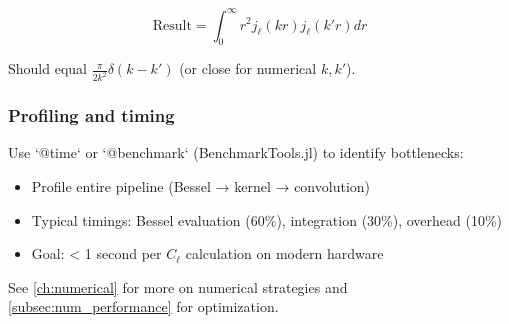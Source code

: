\begin{equation}
\text{Result} = \int_0^\infty r^2 j_\ell(kr) j_\ell(k'r) dr
\end{equation}

Should equal $\frac{\pi}{2k^2} \delta(k-k')$ (or close for numerical $k, k'$).

\subsubsection{Profiling and timing}

Use `@time` or `@benchmark` (BenchmarkTools.jl) to identify bottlenecks:

\begin{itemize}
    \item Profile entire pipeline (Bessel → kernel → convolution)
    \item Typical timings: Bessel evaluation (60\%), integration (30\%), overhead (10\%)
    \item Goal: < 1 second per $C_\ell$ calculation on modern hardware
\end{itemize}


See \cref{ch:numerical} for more on numerical strategies and \cref{subsec:num_performance} for optimization.
